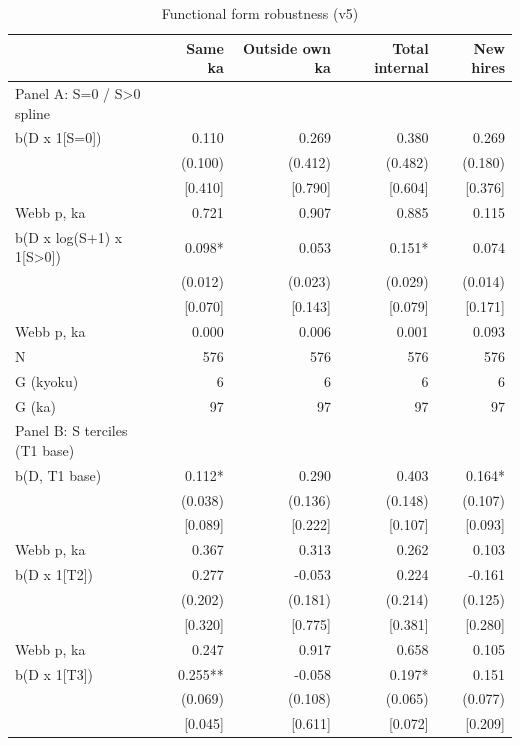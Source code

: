 \begin{table}[!htbp]
  \centering
  \caption{Functional form robustness (v5)}
  \label{tab:v5_functional_form}
  \begin{tabular}{lrrrr}
    \hline\hline
     & Same ka & Outside own ka & Total internal & New hires \\
    \hline
    Panel A: S=0 / S>0 spline &  &  &  &  \\
    b(D x 1[S=0]) & 0.110 & 0.269 & 0.380 & 0.269 \\
     & (0.100) & (0.412) & (0.482) & (0.180) \\
    [Webb p, kyoku] & [0.410] & [0.790] & [0.604] & [0.376] \\
    {Webb p, ka} & {0.721} & {0.907} & {0.885} & {0.115} \\
    b(D x log(S+1) x 1[S>0]) & 0.098* & 0.053 & 0.151* & 0.074 \\
     & (0.012) & (0.023) & (0.029) & (0.014) \\
    [Webb p, kyoku] & [0.070] & [0.143] & [0.079] & [0.171] \\
    {Webb p, ka} & {0.000} & {0.006} & {0.001} & {0.093} \\
    \hline
    N & 576 & 576 & 576 & 576 \\
    G (kyoku) & 6 & 6 & 6 & 6 \\
    G (ka) & 97 & 97 & 97 & 97 \\
    \hline
    Panel B: S terciles (T1 base) &  &  &  &  \\
    b(D, T1 base) & 0.112* & 0.290 & 0.403 & 0.164* \\
     & (0.038) & (0.136) & (0.148) & (0.107) \\
    [Webb p, kyoku] & [0.089] & [0.222] & [0.107] & [0.093] \\
    {Webb p, ka} & {0.367} & {0.313} & {0.262} & {0.103} \\
    b(D x 1[T2]) & 0.277 & -0.053 & 0.224 & -0.161 \\
     & (0.202) & (0.181) & (0.214) & (0.125) \\
    [Webb p, kyoku] & [0.320] & [0.775] & [0.381] & [0.280] \\
    {Webb p, ka} & {0.247} & {0.917} & {0.658} & {0.105} \\
    b(D x 1[T3]) & 0.255** & -0.058 & 0.197* & 0.151 \\
     & (0.069) & (0.108) & (0.065) & (0.077) \\
    [Webb p, kyoku] & [0.045] & [0.611] & [0.072] & [0.209] \\

\end{tabular}
\end{table}
